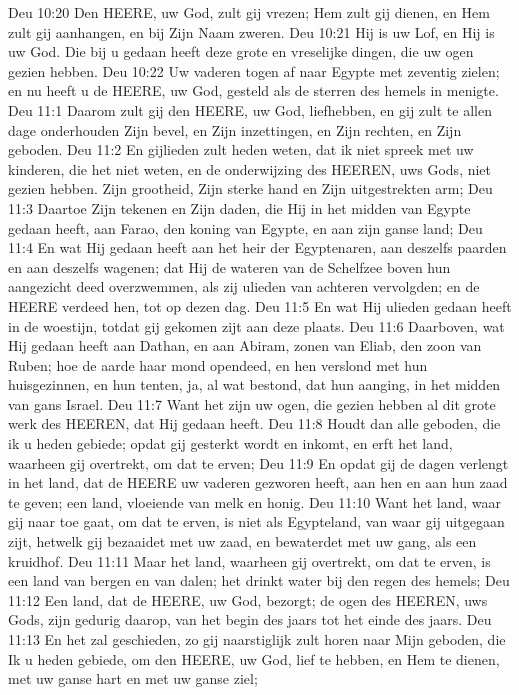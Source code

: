 Deu 10:20  Den HEERE, uw God, zult gij vrezen; Hem zult gij dienen, en Hem zult gij aanhangen, en bij Zijn Naam zweren.
Deu 10:21  Hij is uw Lof, en Hij is uw God. Die bij u gedaan heeft deze grote en vreselijke dingen, die uw ogen gezien hebben.
Deu 10:22  Uw vaderen togen af naar Egypte met zeventig zielen; en nu heeft u de HEERE, uw God, gesteld als de sterren des hemels in menigte.
Deu 11:1  Daarom zult gij den HEERE, uw God, liefhebben, en gij zult te allen dage onderhouden Zijn bevel, en Zijn inzettingen, en Zijn rechten, en Zijn geboden.
Deu 11:2  En gijlieden zult heden weten, dat ik niet spreek met uw kinderen, die het niet weten, en de onderwijzing des HEEREN, uws Gods, niet gezien hebben. Zijn grootheid, Zijn sterke hand en Zijn uitgestrekten arm;
Deu 11:3  Daartoe Zijn tekenen en Zijn daden, die Hij in het midden van Egypte gedaan heeft, aan Farao, den koning van Egypte, en aan zijn ganse land;
Deu 11:4  En wat Hij gedaan heeft aan het heir der Egyptenaren, aan deszelfs paarden en aan deszelfs wagenen; dat Hij de wateren van de Schelfzee boven hun aangezicht deed overzwemmen, als zij ulieden van achteren vervolgden; en de HEERE verdeed hen, tot op dezen dag.
Deu 11:5  En wat Hij ulieden gedaan heeft in de woestijn, totdat gij gekomen zijt aan deze plaats.
Deu 11:6  Daarboven, wat Hij gedaan heeft aan Dathan, en aan Abiram, zonen van Eliab, den zoon van Ruben; hoe de aarde haar mond opendeed, en hen verslond met hun huisgezinnen, en hun tenten, ja, al wat bestond, dat hun aanging, in het midden van gans Israel.
Deu 11:7  Want het zijn uw ogen, die gezien hebben al dit grote werk des HEEREN, dat Hij gedaan heeft.
Deu 11:8  Houdt dan alle geboden, die ik u heden gebiede; opdat gij gesterkt wordt en inkomt, en erft het land, waarheen gij overtrekt, om dat te erven;
Deu 11:9  En opdat gij de dagen verlengt in het land, dat de HEERE uw vaderen gezworen heeft, aan hen en aan hun zaad te geven; een land, vloeiende van melk en honig.
Deu 11:10  Want het land, waar gij naar toe gaat, om dat te erven, is niet als Egypteland, van waar gij uitgegaan zijt, hetwelk gij bezaaidet met uw zaad, en bewaterdet met uw gang, als een kruidhof.
Deu 11:11  Maar het land, waarheen gij overtrekt, om dat te erven, is een land van bergen en van dalen; het drinkt water bij den regen des hemels;
Deu 11:12  Een land, dat de HEERE, uw God, bezorgt; de ogen des HEEREN, uws Gods, zijn gedurig daarop, van het begin des jaars tot het einde des jaars.
Deu 11:13  En het zal geschieden, zo gij naarstiglijk zult horen naar Mijn geboden, die Ik u heden gebiede, om den HEERE, uw God, lief te hebben, en Hem te dienen, met uw ganse hart en met uw ganse ziel;
